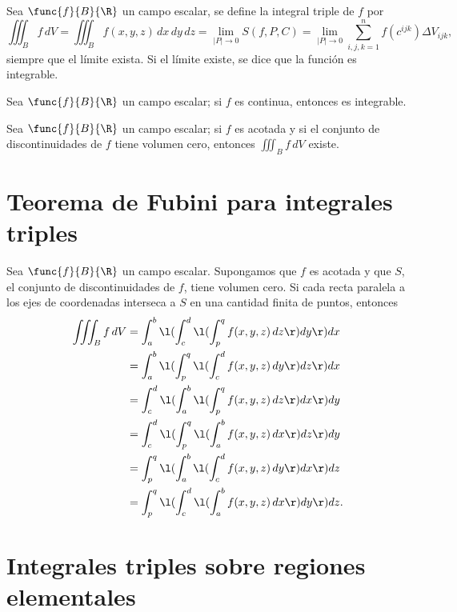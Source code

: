 \documentclass[a4,11pt]{aleph-notas}
\begin{document}
\begin{defi}
    Sea $\func{f}{B}{\R}$ un campo escalar, se define la integral triple de $f$ por
    \[
        \iiint_B f\, dV
        =\iiint_B f(x,y,z)\,dx\,dy\,dz
        = \lim_{|P|\to 0} S(f,P,C)
        = \lim_{|P|\to 0} \sum_{i,j,k=1}^n f(c^{ijk})\Delta V_{ijk},
    \]
    siempre que el límite exista. Si el límite existe, se dice que la función es integrable.
\end{defi}

\begin{prop}
    Sea $\func{f}{B}{\R}$ un campo escalar; si $f$ es continua, entonces es integrable.
\end{prop}

\begin{prop}
    Sea $\func{f}{B}{\R}$ un campo escalar; si $f$ es acotada y si el conjunto de discontinuidades de $f$ tiene volumen cero, entonces $\iiint_B f\, dV$ existe.
\end{prop}

\section{Teorema de Fubini para integrales triples}

\begin{teo}
    Sea $\func{f}{B}{\R}$ un campo escalar. Supongamos que $f$ es acotada y que $S$, el conjunto de discontinuidades de $f$, tiene volumen cero. Si cada recta paralela a los ejes de coordenadas interseca a $S$ en una cantidad finita de puntos, entonces
    \begin{align*}
        \iiint_B f\, dV
        & = \int_a^b \l(\int_c^d \l(\int_p^q f(x,y,z)\, dz\r)dy\r)dx \\
        & = \int_a^b \l(\int_p^q\l( \int_c^d f(x,y,z)\, dy\r)dz\r)dx \\
        & = \int_c^d \l(\int_a^b\l( \int_p^q f(x,y,z)\, dz\r)dx\r)dy \\
        & = \int_c^d \l(\int_p^q\l( \int_a^b f(x,y,z)\, dx\r)dz\r)dy \\
        & = \int_p^q \l(\int_a^b\l( \int_c^d f(x,y,z)\, dy\r)dx\r)dz \\
        & = \int_p^q \l(\int_c^d \l(\int_a^b f(x,y,z)\, dx\r)dy\r)dz.
    \end{align*}
\end{teo}

\section{Integrales triples sobre regiones elementales}
\end{document}
